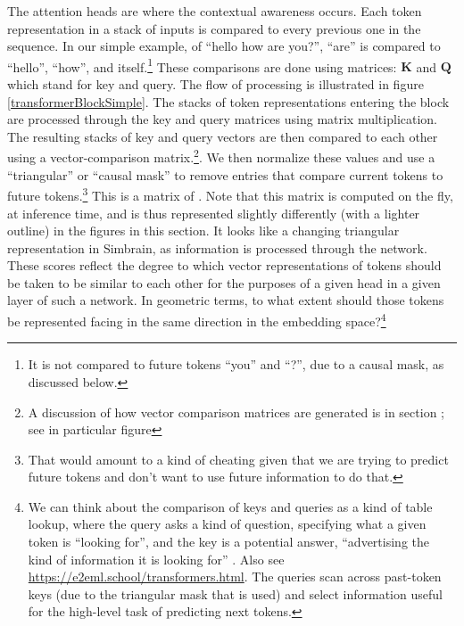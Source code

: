 The attention heads are where the contextual awareness occurs. Each token
representation in a stack of inputs is compared to every previous one in the sequence. In our
simple example, of ``hello how are you?'', ``are'' is compared to ``hello'', ``how'', and itself.\footnote{It is not compared to future tokens ``you'' and ``?'', due to a causal mask, as discussed below.} These comparisons are done using matrices: $\textbf{K}$ and $\textbf{Q}$ which stand for key and query. The flow of processing is illustrated in figure \ref{transformerBlockSimple}. The stacks of token representations entering the block are processed through the key and query matrices using matrix multiplication. The resulting stacks of key and query vectors are then compared to each other using a vector-comparison matrix.\footnote{A discussion of how vector comparison matrices are generated is in section ; see in particular figure }.  We then normalize these values and use a ``triangular'' or ``causal mask'' to remove entries that compare current tokens to future tokens.\footnote{That would amount to a kind of cheating given that we are trying to predict future tokens and don't want to use future information to do that.} This is a matrix of . Note that this matrix is computed on the fly, at inference time, and is thus represented slightly differently (with a lighter outline) in the figures in this section. It looks like a changing triangular representation in Simbrain, as information is processed through the network. These scores reflect the  degree to which vector representations of tokens should be taken to be similar to each other for the purposes of a given head in a given layer of such a network. In geometric terms, to what extent should those tokens  be represented facing in the same direction in the embedding space?\footnote{We can think about the comparison of keys and queries as a kind of table lookup, where the query asks a kind of question, specifying what a given token is ``looking for'', and the key is a potential answer, ``advertising the kind of information it is looking for'' \cite{beckmann2025mechanistic}. Also see \url{https://e2eml.school/transformers.html}. The queries scan across past-token keys (due to the triangular mask that is used) and select information useful for the high-level task of predicting next tokens.} 

